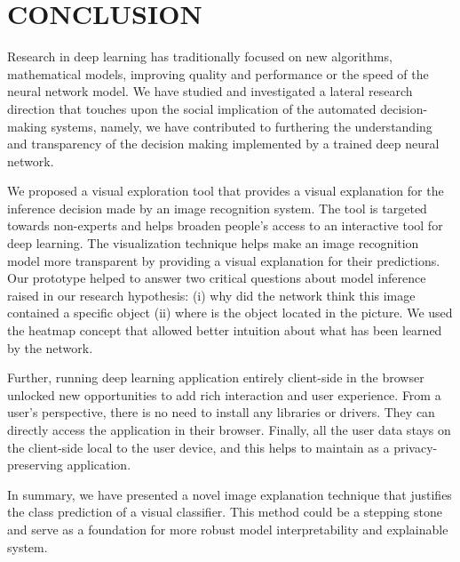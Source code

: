 %
%

\chapter{CONCLUSION}
\thispagestyle{empty}




Research in deep learning has traditionally focused on new algorithms, mathematical models, improving quality and performance or the speed of the neural network model. We have studied and investigated a lateral research direction that touches upon the social implication of the automated decision-making systems, namely, we have contributed to furthering the understanding and transparency of the decision making implemented by a trained deep neural network. 

We proposed a visual exploration tool that provides a visual explanation for the inference decision made by an image recognition system. The tool is targeted towards non-experts and helps broaden people's access to an interactive tool for deep learning. The visualization technique helps make an image recognition model more transparent by providing a visual explanation for their predictions. Our prototype helped to answer two critical questions about model inference raised in our research hypothesis: (i) why did the network think this image contained a specific object (ii) where is the object located in the picture. We used the heatmap concept that allowed better intuition about what has been learned by the network.

Further, running deep learning application entirely client-side in the browser unlocked new opportunities to add rich interaction and user experience. From a user's perspective, there is no need to install any libraries or drivers. They can directly access the application in their browser. Finally, all the user data stays on the client-side local to the user device, and this helps to maintain as a privacy-preserving application.

In summary, we have presented a novel image explanation technique that justifies the class prediction of a visual classifier. This method could be a  stepping stone and serve as a foundation for more robust model interpretability and explainable system.


